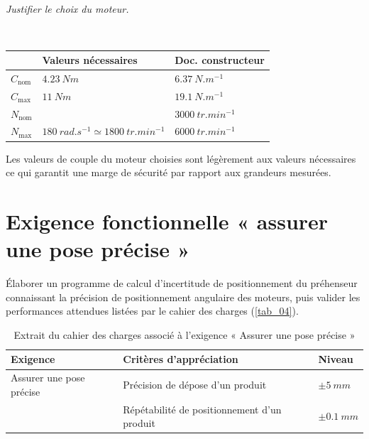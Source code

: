 \documentclass[10pt,fleqn]{article} %
\begin{document}
\subparagraph{\label{q}}\textit{Justifier le choix du moteur.}
\ifprof
\begin{corrige} ~\\

\begin{center}
\begin{tabular}{lll}
\hline 
& \textbf{Valeurs nécessaires} & \textbf{Doc. constructeur} \\
\hline\hline
$C_{\text{nom}}$ & $\SI{4,23}{Nm}$ & $\SI{6,37}{N.m^{-1}}$ \\
$C_{\text{max}}$ &$ \SI{11}{Nm}$  & $\SI{19,1}{N.m^{-1}}$ \\
$N_{\text{nom}}$ & & $\SI{3000}{tr.min^{-1}}$ \\
$N_{\text{max}}$ & $\SI{180}{rad.s^{-1}}\simeq  \SI{1800}{tr.min^{-1}}$ & $\SI{6000}{tr.min^{-1}}$\\
\hline
\end{tabular}
\end{center}

Les valeurs de couple du moteur choisies sont légèrement aux valeurs nécessaires ce qui garantit une marge de sécurité par rapport aux grandeurs mesurées. 
%
\end{corrige}
\else
\fi


\section{Exigence fonctionnelle « assurer une pose précise »}

\begin{obj}
Élaborer un programme de calcul d’incertitude de positionnement du préhenseur connaissant la précision
de positionnement angulaire des moteurs, puis valider les performances attendues listées par le
cahier des charges (\autoref{tab_04}).
\end{obj}


\ifprof
\else

\begin{table}[H]
\centering
\begin{tabular}{|l|l|l|}
\hline
\textbf{Exigence} & \textbf{Critères d'appréciation} & \textbf{Niveau} \\ \hline
Assurer une pose précise & Précision de dépose d'un produit & $\pm\SI{5}{mm}$ \\ \cline{2-3}
& Répétabilité de positionnement d'un produit & $\pm\SI{0,1}{mm}$ \\ \hline
\end{tabular}
\caption{Extrait du cahier des charges
associé à l’exigence « Assurer une pose précise » \label{tab_04}}
\end{table}
\end{document}

